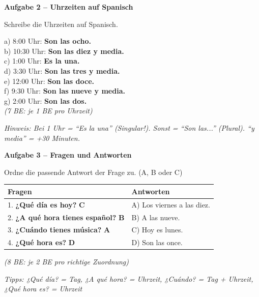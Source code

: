 \documentclass[11pt, a4paper]{article}
\newcommand{\fachfarbe}{spanisch}
\newcommand{\punktebox}[1]{\hfill\fbox{\small \_\_\_/#1}}
\newcommand{\lsg}[1]{\textcolor{loesung}{\textbf{#1}}}
\newenvironment{aufgabe}[1]{%
    \vspace{12pt}
    \noindent\textbf{\textcolor{\fachfarbe}{Aufgabe #1}}
    \vspace{6pt}
    \begin{list}{}{\leftmargin=0pt}
    \item[]
}{%
    \end{list}
}
\newcommand{\es}[1]{\textcolor{\fachfarbe}{\textbf{#1}}}
\begin{document}
\begin{aufgabe}{2 -- Uhrzeiten auf Spanisch}
Schreibe die Uhrzeiten auf Spanisch. \punktebox{7}
\end{aufgabe}

\noindent
a) 8:00 Uhr: \lsg{Son las ocho.} \\[0.8em]
b) 10:30 Uhr: \lsg{Son las diez y media.} \\[0.8em]
c) 1:00 Uhr: \lsg{Es la una.} \\[0.8em]
d) 3:30 Uhr: \lsg{Son las tres y media.} \\[0.8em]
e) 12:00 Uhr: \lsg{Son las doce.} \\[0.8em]
f) 9:30 Uhr: \lsg{Son las nueve y media.} \\[0.8em]
g) 2:00 Uhr: \lsg{Son las dos.} \\

\textcolor{loesung}{\textit{(7 BE: je 1 BE pro Uhrzeit)}}

\textcolor{loesung}{\textit{Hinweis: Bei 1 Uhr = ``Es la una'' (Singular!). Sonst = ``Son las...'' (Plural). ``y media'' = +30 Minuten.}}

\vspace{15pt}


\begin{aufgabe}{3 -- Fragen und Antworten}
Ordne die passende Antwort der Frage zu. (A, B oder C) \punktebox{8}
\end{aufgabe}

\noindent
\begin{tabular}{|p{6cm}|p{6cm}|}
\hline
\textbf{Fragen} & \textbf{Antworten} \\
\hline
1. \es{¿Qué día es hoy?} \lsg{C} & A) Los viernes a las diez. \\[0.5em]
2. \es{¿A qué hora tienes español?} \lsg{B} & B) A las nueve. \\[0.5em]
3. \es{¿Cuándo tienes música?} \lsg{A} & C) Hoy es lunes. \\[0.5em]
4. \es{¿Qué hora es?} \lsg{D} & D) Son las once. \\
\hline
\end{tabular}

\textcolor{loesung}{\textit{(8 BE: je 2 BE pro richtige Zuordnung)}}

\textcolor{loesung}{\textit{Tipps: ¿Qué día? = Tag, ¿A qué hora? = Uhrzeit, ¿Cuándo? = Tag + Uhrzeit, ¿Qué hora es? = Uhrzeit}}
\end{document}
